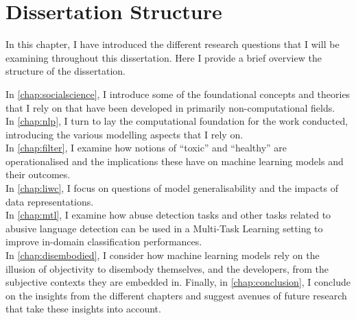\section{Dissertation Structure}\label{sec:structure}

In this chapter, I have introduced the different research questions that I will be examining throughout this dissertation. Here I provide a brief overview the structure of the dissertation.

In \cref{chap:socialscience}, I introduce some of the foundational concepts and theories that I rely on that have been developed in primarily non-computational fields.\\
In \cref{chap:nlp}, I turn to lay the computational foundation for the work conducted, introducing the various modelling aspects that I rely on.\\
In \cref{chap:filter}, I examine how notions of ``toxic'' and ``healthy'' are operationalised and the implications these have on machine learning models and their outcomes.\\
In \cref{chap:liwc}, I focus on questions of model generalisability and the impacts of data representations.\\
In \cref{chap:mtl}, I examine how abuse detection tasks and other tasks related to abusive language detection can be used in a Multi-Task Learning setting to improve in-domain classification performances.\\
In \cref{chap:disembodied}, I consider how machine learning models rely on the illusion of objectivity to disembody themselves, and the developers, from the subjective contexts they are embedded in.
Finally, in \cref{chap:conclusion}, I conclude on the insights from the different chapters and suggest avenues of future research that take these insights into account.



